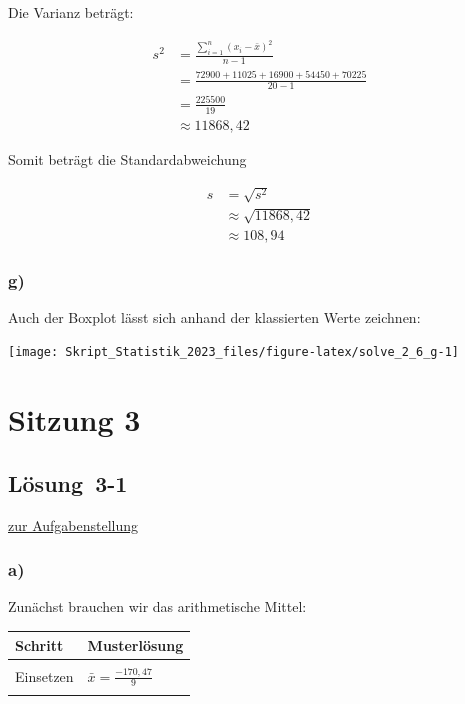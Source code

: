 \documentclass[
  11pt,
  ngerman,
  a4paper,
]{report}
\begin{document}
Die Varianz beträgt:

\[\begin{aligned}
  s^2&=\frac{\sum\limits_{i=1}^{n}(x_{i}-\bar{x})^2}{n-1} \\
     &=\frac{72900+11025+16900+54450+70225}{20-1}\\
     &=\frac{225500}{19}\\
     &\approx{11868{,}42}
\end{aligned}\]

Somit beträgt die Standardabweichung

\[\begin{aligned}
  s&=\sqrt{s^2}\\
   &\approx\sqrt{11868{,}42}\\
   &\approx108{,}94
\end{aligned}\]

\hypertarget{g}{%
\subsubsection{g)}\label{g}}

Auch der Boxplot lässt sich anhand der klassierten Werte zeichnen:

\begin{center}\texttt{[image: Skript\_Statistik\_2023\_files/figure-latex/solve\_2\_6\_g-1]} \end{center}

\hypertarget{sitzung-3}{%
\section*{Sitzung 3}\label{sitzung-3}}

\hypertarget{loesung-3-1}{%
\subsection{Lösung~3-1}\label{loesung-3-1}}

\protect\hyperlink{aufgabe-3-1}{zur Aufgabenstellung}

\hypertarget{a-8}{%
\subsubsection{a)}\label{a-8}}

Zunächst brauchen wir das arithmetische Mittel:

\begin{table}[H]
\centering
\begin{tabular}{l>{\raggedright\arraybackslash}p{8cm}}
\toprule
\textbf{Schritt} & \textbf{Musterlösung}\\
\midrule
\cellcolor{gray!6}{Formel} & \cellcolor{gray!6}{$\bar{x}=\frac{\sum\limits_{i=1}^{n}x_{i}}{n}$}\\
Einsetzen & $\bar{x}=\frac{-170{,}47}{9}$\\
\cellcolor{gray!6}{Ergebnis} & \cellcolor{gray!6}{$\bar{x}=-18{,}94$}\\
\bottomrule
\end{tabular}
\end{table}
\end{document}
